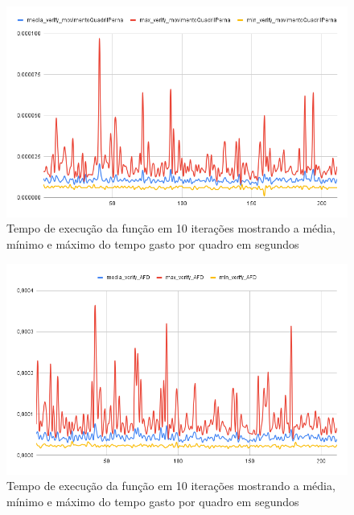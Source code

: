 \begin{figure}[H]
	\centering
	\caption{Tempo de execução da função  em 10 iterações mostrando a média, mínimo e máximo do tempo gasto por quadro em segundos}
	\includegraphics[scale=0.55]{figuras/grafico/movimentoQuadril.png}
\end{figure}


\begin{figure}[H]
	\centering
	\caption{Tempo de execução da função  em 10 iterações mostrando a média, mínimo e máximo do tempo gasto por quadro em segundos}
	\includegraphics[scale=0.55]{figuras/grafico/verify_AFD.png}
\end{figure}


